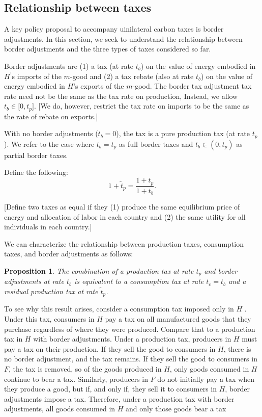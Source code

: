 \documentclass[notitlepage,12pt]{article}
\newtheorem{proposition}[theorem]{Proposition}
\begin{document}
\subsection{Relationship between taxes}

A key policy proposal to accompany uinilateral carbon taxes is border
adjustments. In this section, we seek to understand the relationship between
border adjustments and the three types of taxes considered so far.

Border adjustments are (1) a tax (at rate $t_{b}$) on the value of energy
embodied in $H^{\prime }$s imports of the $m$-good and (2) a tax rebate
(also at rate $t_{b}$) on the value of energy embodied in $H$'s exports of
the $m$-good. The border tax adjustment tax rate need not be the same as the
tax rate on production, Instead, we allow $t_{b}\in \lbrack 0,t_{p}]$. [We
do, however, restrict the tax rate on imports to be the same as the rate of
rebate on exports.]

With no border adjustments ($t_{b}=0$), the tax is a pure production tax (at
rate $t_{p}$). We refer to the case where $t_{b}=t_{p}$ as full border taxes
and $t_{b}\in \left( 0,t_{p}\right) $ as partial border taxes.

Define the following:%
\begin{equation*}
1+\tilde{t}_{p}=\frac{1+t_{p}}{1+t_{b}}.
\end{equation*}

[Define two taxes as equal if they (1) produce the same equilibrium price of
energy and allocation of labor in each country and (2) the same utility for
all individuals in each country.]

We can characterize the relationship between production taxes, consumption
taxes, and border adjustments as follows:

\begin{proposition}
The combination of a production tax at rate $t_{p}$ and border adjustments
at rate $t_{b}$ is equivalent to a consumption tax at rate $t_{c}=t_{b}$ and
a residual production tax at rate $\tilde{t}_{p}$.
\end{proposition}

To see why this result arises, consider a consumption tax imposed only in $H$%
. Under this tax, consumers in $H$ pay a tax on all manufactured goods that
they purchase regardless of where they were produced. Compare that to a
production tax in $H$ with border adjustments. Under a production tax,
producers in $H$ must pay a tax on their production. If they sell the good
to consumers in $H$, there is no border adjustment, and the tax remains. If
they sell the good to consumers in $F$, the tax is removed, so of the goods
produced in $H$, only goods consumed in $H$ continue to bear a tax.
Similarly, producers in $F$ do not initially pay a tax when they produce a
good, but if, and only if, they sell it to consumers in $H$, border
adjustments impose a tax. Therefore, under a production tax with border
adjustments, all goods consumed in $H$ and only those goods bear a tax
\end{document}

